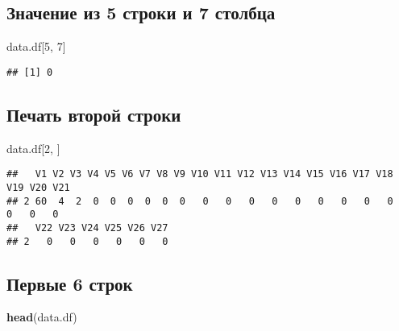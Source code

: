 \documentclass[
]{article}
\newenvironment{Shaded}{\begin{snugshade}}{\end{snugshade}}
\newcommand{\DecValTok}[1]{\textcolor[rgb]{0.00,0.00,0.81}{#1}}
\newcommand{\FunctionTok}[1]{\textcolor[rgb]{0.13,0.29,0.53}{\textbf{#1}}}
\newcommand{\NormalTok}[1]{#1}
\begin{document}
\subsection{Значение из 5 строки и 7
столбца}\label{ux437ux43dux430ux447ux435ux43dux438ux435-ux438ux437-5-ux441ux442ux440ux43eux43aux438-ux438-7-ux441ux442ux43eux43bux431ux446ux430}

\begin{Shaded}
\begin{Highlighting}[]
\NormalTok{data.df[}\DecValTok{5}\NormalTok{, }\DecValTok{7}\NormalTok{]}
\end{Highlighting}
\end{Shaded}

\begin{verbatim}
## [1] 0
\end{verbatim}

\subsection{Печать второй
строки}\label{ux43fux435ux447ux430ux442ux44c-ux432ux442ux43eux440ux43eux439-ux441ux442ux440ux43eux43aux438}

\begin{Shaded}
\begin{Highlighting}[]
\NormalTok{data.df[}\DecValTok{2}\NormalTok{, ]}
\end{Highlighting}
\end{Shaded}

\begin{verbatim}
##   V1 V2 V3 V4 V5 V6 V7 V8 V9 V10 V11 V12 V13 V14 V15 V16 V17 V18 V19 V20 V21
## 2 60  4  2  0  0  0  0  0  0   0   0   0   0   0   0   0   0   0   0   0   0
##   V22 V23 V24 V25 V26 V27
## 2   0   0   0   0   0   0
\end{verbatim}

\subsection{Первые 6
строк}\label{ux43fux435ux440ux432ux44bux435-6-ux441ux442ux440ux43eux43a}

\begin{Shaded}
\begin{Highlighting}[]
\FunctionTok{head}\NormalTok{(data.df)}
\end{Highlighting}
\end{Shaded}
\end{document}
